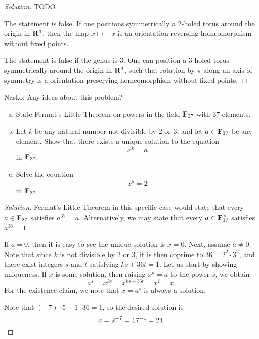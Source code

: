 \begin{proof}[Solution]
  TODO
  
  The statement is false. If one positions symmetrically a 2-holed torus around the origin in $\mathbf{R}^3$, then the map $x \mapsto -x$ is an orientation-reversing homeomorphism without fixed points.
  
  The statement is false if the genus is $3$. One can position a 3-holed torus symmetrically around the origin in $\mathbf{R}^3$, such that rotation by $\pi$ along an axis of symmetry is a orientation-preserving homeomorphism without fixed points.
\end{proof}

Nasko: Any ideas about this problem?


\begin{enumerate}[(a)]
\item State Fermat's Little Theorem on powers in the field $\mathbf{F}_{37}$ with $37$ elements.
\item Let $k$ be any natural number not divisible by $2$ or $3$, and let $a \in \mathbf{F}_{37}$ be any element. Show that there exists a unique solution to the equation
  \[
  x^k = a
  \]
  in $\mathbf{F}_{37}$.
\item Solve the equation
  \[
  x^5 = 2
  \]
  in $\mathbf{F}_{37}$.
\end{enumerate}

\begin{proof}[Solution]
  Fermat's Little Theorem in this specific case would state that every $a \in \mathbf{F}_{37}$ satisfies $a^{37} = a$. Alternatively, we may state that every $a \in \mathbf{F}_{37}^{\times}$ satisfies $a^{36} = 1$.
  
  If $a = 0$, then it is easy to see the unique solution is $x = 0$. Next, assume $a \neq 0$. Note that since $k$ is not divisible by $2$ or $3$, it is then coprime to $36 = 2^2 \cdot 3^2$, and there exist integers $s$ and $t$ satisfying $k s + 36 t = 1$. Let us start by showing uniqueness. If $x$ is some solution, then raising $x^k = a$ to the power $s$, we obtain
  \[
  a^s = x^{k s} = x^{k s + 36 t} = x^1 = x.
  \]
  For the existence claim, we note that $x = a^s$ is always a solution.
  
  Note that $(-7) \cdot 5 + 1 \cdot 36 = 1$, so the desired solution is
  \[
  x = 2^{-7} = 17^{-1} = 24. \qedhere
  \]
\end{proof}


